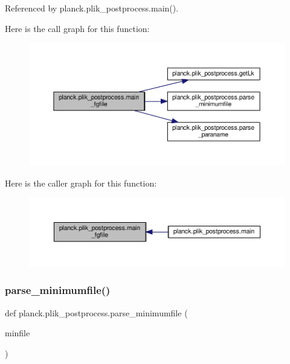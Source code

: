 Referenced by planck.\+plik\+\_\+postprocess.\+main().

Here is the call graph for this function\+:
\nopagebreak
\begin{figure}[H]
\begin{center}
\leavevmode
\includegraphics[width=350pt]{namespaceplanck_1_1plik__postprocess_a3cd097f3d46e5e0635b5d5d6b738631c_cgraph}
\end{center}
\end{figure}
Here is the caller graph for this function\+:
\nopagebreak
\begin{figure}[H]
\begin{center}
\leavevmode
\includegraphics[width=350pt]{namespaceplanck_1_1plik__postprocess_a3cd097f3d46e5e0635b5d5d6b738631c_icgraph}
\end{center}
\end{figure}
\mbox{\label{namespaceplanck_1_1plik__postprocess_aa2e7d0756c0811893711c9aecf83baee}} 
\subsubsection{\texorpdfstring{parse\+\_\+minimumfile()}{parse\_minimumfile()}}
{\footnotesize\ttfamily def planck.\+plik\+\_\+postprocess.\+parse\+\_\+minimumfile (\begin{DoxyParamCaption}\item[{}]{minfile }\end{DoxyParamCaption})}



